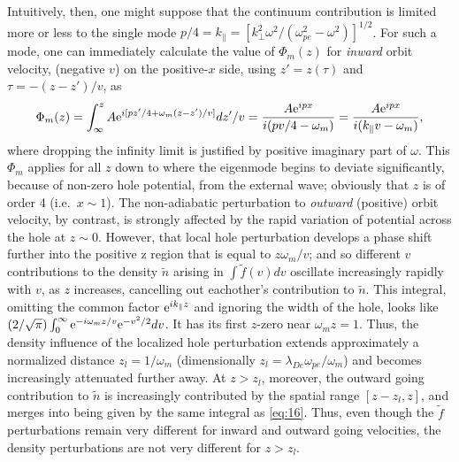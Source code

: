 \documentclass[12pt]{article}
\def\etothe#1{{\rm e}^{#1}}
\begin{document}
Intuitively, then, one might suppose that the continuum contribution is
limited more or less to the single mode
$p/4=k_\parallel= [k_\perp^2\omega^2/(\omega_{pe}^2-\omega^2)]^{1/2}$.
For such a mode, one can immediately calculate the value of $\Phi_m(z)$
for \emph{inward} orbit velocity, (negative $v$) on the positive-$x$
side, using $z'=z(\tau)$ and $\tau=-(z-z')/v$, as
\begin{equation}
  \label{eq:16}
  \Phi_m(z) = \int_{\infty}^zA{\rm e}^{i[pz'/4+\omega_m
    (z-z')/v]}dz'/v
  ={A{\rm e}^{ipx} \over i(pv/4-\omega_m)}={A{\rm e}^{ipx} \over
    i(k_\parallel v-\omega_m)},
\end{equation}
where dropping the infinity limit is justified by positive imaginary
part of $\omega$.  This $\Phi_m$ applies for all $z$ down to where the
eigenmode begins to deviate significantly, because of non-zero hole
potential, from the external wave; obviously that $z$ is of order 4
(i.e.\ $x\sim 1$). The non-adiabatic perturbation to \emph{outward}
(positive) orbit velocity, by contrast, is strongly affected by the
rapid variation of potential across the hole at $z\sim 0$. However,
that local hole perturbation develops a phase shift further into the
positive z region that is equal to $z\omega_m/v$; and so different $v$
contributions to the density $\tilde n$ arising in
$\int \tilde f(v) dv$ oscillate increasingly rapidly with $v$, as $z$
increases, cancelling out eachother's contribution to $\tilde n$. This
integral, omitting the common factor $\etothe{ik_\parallel z}$ and
ignoring the width of the hole, looks like
$(2/\sqrt{\pi})\int_0^\infty \etothe{-i\omega_m
  z/v}\etothe{-v^2/2}dv$.  It has its first $z$-zero near
$\omega_m z=1$. Thus, the density influence of the localized hole
perturbation extends approximately a normalized distance
$z_l=1/\omega_m$ (dimensionally
$z_l= \lambda_{De}\omega_{pe}/\omega_m$) and becomes increasingly
attenuated further away. At $z>z_l$, moreover, the outward going
contribution to $\tilde n$ is increasingly contributed by the spatial
range $[z-z_l,z]$, and merges into being given by the same integral as
\ref{eq:16}.  Thus, even though the $\tilde f$ perturbations remain
very different for inward and outward going velocities, the density
perturbations are not very different for $z>z_l$.
\end{document}
